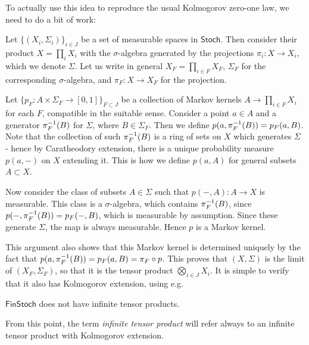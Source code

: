 \documentclass[11pt]{article}
\renewcommand{\sf}{\mathsf}
\begin{document}
To actually use this idea to reproduce the usual Kolmogorov zero-one law, we need to do a bit of work:

\begin{example}
Let $\{(X_i,\Sigma_i)\}_{i\in J}$ be a set of measurable spaces in $\sf{Stoch}$.
Then consider their product $X = \prod_i X_i$ with the $\sigma$-algebra generated by the projections $\pi_i: X \to X_i$, which we denote $\Sigma$.
Let us write in general $X_F = \prod_{i\in F}X_F$, $\Sigma_F$ for the corresponding $\sigma$-algebra, and $\pi_F: X \to X_F$ for the projection.

Let $\{p_F: A \times \Sigma_F \to [0,1]\}_{F \subset J}$ be a collection of Markov kernels $A \to \prod_{i \in F}X_i$ for each $F$, compatible in the suitable sense.
Consider a point $a \in A$ and a generator $\pi_F^{-1}(B)$ for $\Sigma$, where $B \in \Sigma_F$.
Then we define $p(a,\pi_F^{-1}(B)) = p_F(a,B)$.
Note that the collection of such $\pi_F^{-1}(B)$ is a ring of sets on $X$ which generates $\Sigma$ - hence by Caratheodory extension, there is a unique probability measure
$p(a,-)$ on $X$ extending it. This is how we define $p(a,A)$ for general subsets $A \subset X$.

Now consider the class of subsets $A \in \Sigma$ such that $p(-,A):A \to X$ is measurable.
This class is a $\sigma$-algebra, which contains $\pi_F^{-1}(B)$, since $p(-,\pi_F^{-1}(B)) = p_F(-,B)$, which is measurable by assumption.
Since these generate $\Sigma$, the map is always measurable.
Hence $p$ is a Markov kernel.

This argument also shows that this Markov kernel is determined uniquely by the fact that $p(a,\pi_F^{-1}(B)) = p_F(a,B) = \pi_F \circ p$.
This proves that $(X,\Sigma)$ is the limit of $(X_F,\Sigma_F)$, so that it is the tensor product $\bigotimes_{i\in J} X_i$.
It is simple to verify that it also has Kolmogorov extension, using e.g. \cite[Example~10.4]{markov_cats}
\end{example}

\begin{example}
	\label{infprods_finstoch}
	$\sf{FinStoch}$ does not have infinite tensor products.
\end{example}

From this point, the term \emph{infinite tensor product} will refer always to an infinite tensor product with Kolmogorov extension.
\end{document}
